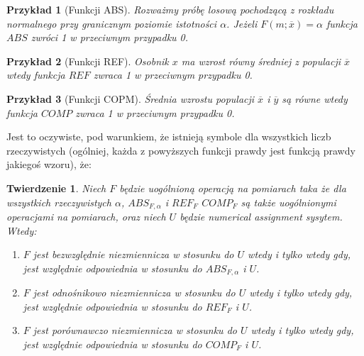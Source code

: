 \documentclass[12pt,a4paper]{report}
\newtheorem{przyklad}{Przykład}
\newtheorem{tw}[definition]{Twierdzenie}
\begin{document}
\begin{przyklad}[Funkcji ABS]
Rozważmy próbę losową pochodzącą z rozkładu normalnego przy granicznym poziomie istotności $\alpha$. Jeżeli $ F(m;\overline{x})=\alpha$ funkcja $ABS$ zwróci 1 w przeciwnym przypadku 0.
\end{przyklad}
\begin{przyklad}[Funkcji REF]
Osobnik $x$ ma wzrost równy średniej z populacji $\overline{x}$ wtedy funkcja $REF$ zwraca 1 w przeciwnym przypadku 0.
\end{przyklad}
\begin{przyklad}[Funkcji COPM]
Średnia wzrostu populacji $\overline{x}$ i $\overline{y}$ są równe wtedy funkcja $COMP$ zwraca 1 w przeciwnym przypadku 0.
\end{przyklad}
Jest to oczywiste, pod warunkiem, że istnieją symbole dla wszystkich liczb rzeczywistych (ogólniej, każda z powyższych funkcji prawdy jest funkcją prawdy jakiegoś wzoru), że:
\begin{tw}
Niech $F$ będzie uogólnioną operacją na pomiarach taka że dla wszystkich rzeczywistych $\alpha$, $ABS_{F,\alpha}$ i $REF_{F}$ $COMP_{F}$ są także uogólnionymi operacjami na pomiarach, oraz niech $U$ będzie numerical assignment sysytem. Wtedy:
\begin{enumerate}
\item
$F$ jest bezwzględnie niezmiennicza w stosunku do $U$ wtedy i tylko wtedy gdy, jest względnie odpowiednia w stosunku do $ABS_{F,\alpha}$ i $U$.
\item
$F$ jest odnośnikowo niezmiennicza w stosunku do $U$ wtedy i tylko wtedy gdy, jest względnie odpowiednia w stosunku do $REF_{F}$ i $U$.  
\item
$F$ jest porównawczo niezmiennicza w stosunku do $U$ wtedy i tylko wtedy gdy, jest względnie odpowiednia w stosunku do $COMP_{F}$ i $U$.    
\end{enumerate}
\end{tw}
\end{document}
